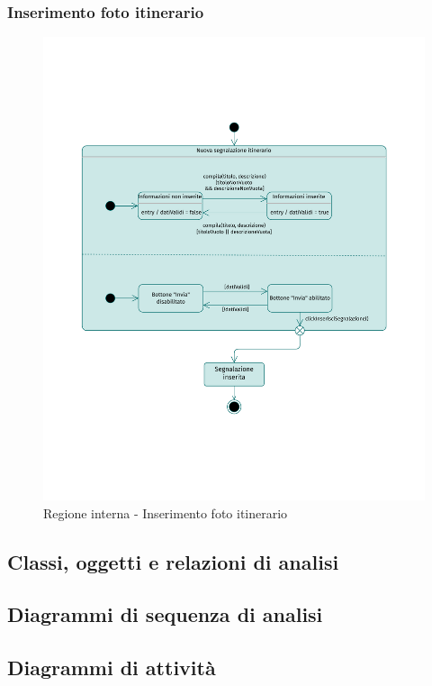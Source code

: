 \documentclass{natourDoc}
\begin{document}
\subsubsection{Inserimento foto itinerario}
\begin{figure}[!htbp]
	\centering
	\includegraphics[width=\textwidth, page=5]{./diagrams/statechart.pdf}
	\caption{Regione interna - Inserimento foto itinerario}
\end{figure}
\FloatBarrier

\newpage
\subsection{Classi, oggetti e relazioni di analisi}

\newpage
\subsection{Diagrammi di sequenza di analisi}

\newpage
\subsection{Diagrammi di attività}
\end{document}
